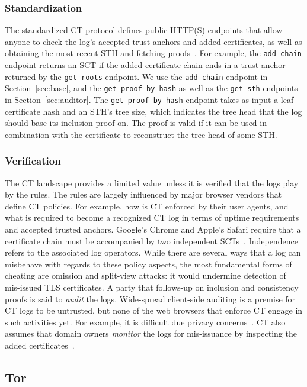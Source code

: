 \subsubsection{Standardization}
The standardized CT protocol defines public HTTP(S) endpoints that allow anyone
to check the log's accepted trust anchors and added certificates, as well as
obtaining the most recent STH and fetching proofs~\cite{ct,ct/bis}.  For
example, the \texttt{add-chain} endpoint returns an SCT if the added certificate
chain ends in a trust anchor returned by the \texttt{get-roots} endpoint.  We
use the \texttt{add-chain} endpoint in Section~\ref{sec:base}, and the
\texttt{get-proof-by-hash} as well as the \texttt{get-sth} endpoints in
Section~\ref{sec:auditor}.  The \texttt{get-proof-by-hash} endpoint takes as
input a leaf certificate hash and an STH's tree size, which indicates the tree
head that the log should base its inclusion proof on.  The proof is valid if it
can be used in combination with the certificate to reconstruct the tree head of
some STH.

\subsubsection{Verification}
The CT landscape provides a limited value unless it is verified that the logs
play by the rules.  The rules are largely influenced by major browser vendors
that define CT policies.  For example, how is CT enforced by their user agents,
and what is required to become a recognized CT log in terms of uptime
requirements and accepted trusted anchors.  Google's Chrome and Apple's Safari
require that a certificate chain must be accompanied by two independent
SCTs~\cite{chrome-policy,safari-policy}.  Independence refers to the associated
log operators.  While there are several ways that
a log can misbehave with regards to these policy aspects, the most fundamental
forms of cheating are omission and split-view attacks:
	it would undermine detection of mis-issued TLS certificates.
A party that follows-up on inclusion and consistency proofs is said to
\emph{audit} the logs.  Wide-spread client-side auditing is a premise for CT
logs to be untrusted, but none of the web browsers that enforce CT engage in
such activities yet.  For example, it is difficult due privacy
concerns~\cite{ct-with-privacy}.  CT also assumes that domain owners
\emph{monitor} the logs for mis-issuance by inspecting the added
certificates~\cite{lwm,ct-monitors}.

\subsection{Tor} \label{sec:background:tor}

